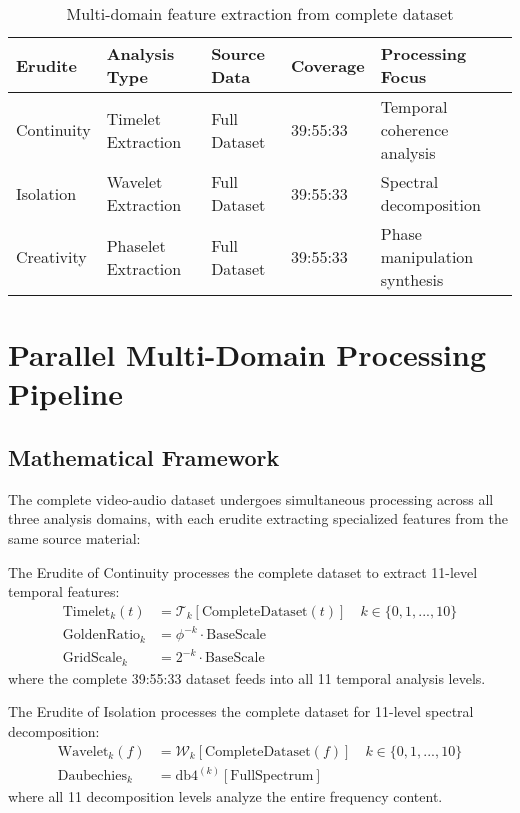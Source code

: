 \begin{table}[h]
\centering
\begin{tabular}{|l|l|l|l|l|}
\hline
\textbf{Erudite} & \textbf{Analysis Type} & \textbf{Source Data} & \textbf{Coverage} & \textbf{Processing Focus} \\
\hline
Continuity & Timelet Extraction & Full Dataset & 39:55:33 & Temporal coherence analysis \\
\hline
Isolation & Wavelet Extraction & Full Dataset & 39:55:33 & Spectral decomposition \\
\hline
Creativity & Phaselet Extraction & Full Dataset & 39:55:33 & Phase manipulation synthesis \\
\hline
\end{tabular}
\caption{Multi-domain feature extraction from complete dataset}
\end{table}

\section{Parallel Multi-Domain Processing Pipeline}

\subsection{Mathematical Framework}

The complete video-audio dataset undergoes simultaneous processing across all three analysis domains, with each erudite extracting specialized features from the same source material:

\begin{definition}
The Erudite of Continuity processes the complete dataset to extract 11-level temporal features:
\begin{align}
\text{Timelet}_{k}(t) &= \mathcal{T}_k[\text{CompleteDataset}(t)] \quad k \in \{0,1,...,10\} \\
\text{GoldenRatio}_{k} &= \phi^{-k} \cdot \text{BaseScale} \\
\text{GridScale}_{k} &= 2^{-k} \cdot \text{BaseScale}
\end{align}
where the complete 39:55:33 dataset feeds into all 11 temporal analysis levels.
\end{definition}

\begin{definition}
The Erudite of Isolation processes the complete dataset for 11-level spectral decomposition:
\begin{align}
\text{Wavelet}_{k}(f) &= \mathcal{W}_k[\text{CompleteDataset}(f)] \quad k \in \{0,1,...,10\} \\
\text{Daubechies}_{k} &= \text{db4}^{(k)}[\text{FullSpectrum}]
\end{align}
where all 11 decomposition levels analyze the entire frequency content.
\end{definition}

